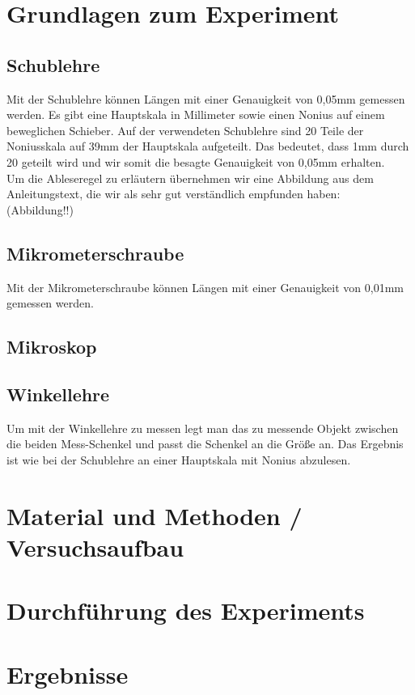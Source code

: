 \documentclass{article}
\begin{document}
\section{Grundlagen zum Experiment}
\subsection*{Schublehre}
Mit der Schublehre können Längen mit einer Genauigkeit von 0,05mm gemessen werden. Es gibt eine Hauptskala in Millimeter sowie einen Nonius auf einem beweglichen Schieber. Auf der verwendeten Schublehre sind 20 Teile der Noniusskala auf 39mm der Hauptskala aufgeteilt. Das bedeutet, dass 1mm durch 20 geteilt wird und wir somit die besagte Genauigkeit von 0,05mm erhalten.\\
Um die Ableseregel zu erläutern übernehmen wir eine Abbildung aus dem Anleitungstext, die wir als sehr gut verständlich empfunden haben:\\
(Abbildung!!)

\subsection*{Mikrometerschraube}
Mit der Mikrometerschraube können Längen mit einer Genauigkeit von 0,01mm gemessen werden.

\subsection*{Mikroskop}

\subsection*{Winkellehre}
Um mit der Winkellehre zu messen legt man das zu messende Objekt zwischen die beiden Mess-Schenkel und passt die Schenkel an die Größe an. Das Ergebnis ist wie bei der Schublehre an einer Hauptskala mit Nonius abzulesen.

\section{Material und Methoden / Versuchsaufbau}

\section{Durchführung des Experiments}

\section{Ergebnisse}
\end{document}
